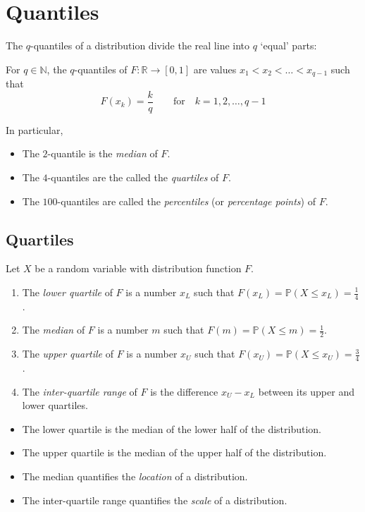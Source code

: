 \documentclass[lecture]{csm}
\newcommand{\prob}{\mathbb{P}}
\newcommand{\N}{\mathbb{N}}
\newcommand{\R}{\mathbb{R}}
\def\it{\item}
\def\bit{\begin{itemize}}
\def\eit{\end{itemize}}
\def\ben{\begin{enumerate}}
\def\een{\end{enumerate}}
\begin{document}
\section{Quantiles}
The $q$-quantiles of a distribution divide the real line into $q$ `equal' parts:

\begin{definition}
For $q\in\N$, the $q$-quantiles of $F:\R\to[0,1]$ are values $x_1 < x_2 < \ldots < x_{q-1}$ such that 
\[
F(x_k) = \frac{k}{q} \qquad\text{for}\quad k=1,2,\ldots,q-1
\]
\end{definition}

In particular,
\bit
\it The $2$-quantile is the \emph{median} of $F$.
\it The $4$-quantiles are the called the \emph{quartiles} of $F$.
\it The $100$-quantiles are called the \emph{percentiles} (or \emph{percentage points}) of $F$.
\eit

\newpage
\subsection{Quartiles}
\begin{definition}
Let $X$ be a random variable with distribution function $F$.
\ben
\it 
The \emph{lower quartile} of $F$ is a number $x_L$ such that $\displaystyle F(x_L) = \prob(X \leq x_L) = \frac{1}{4}$.
\it
The \emph{median} of $F$ is a number $m$ such that $\displaystyle F(m) = \prob(X \leq m) = \frac{1}{2}$.
\it
The \emph{upper quartile} of $F$ is a number $x_U$ such that $\displaystyle F(x_U) = \prob(X \leq x_U) = \frac{3}{4}$.
\it 
The \emph{inter-quartile range} of $F$ is the difference $x_U-x_L$ between its upper and lower quartiles.
\een
\end{definition}

\begin{remark}
\bit
\it The lower quartile is the median of the lower half of the distribution.
\it The upper quartile is the median of the upper half of the distribution.
\eit
\bit
\it The median quantifies the \emph{location} of a distribution.
\it The inter-quartile range quantifies the \emph{scale} of a distribution.
\eit
\end{remark}

\newpage
\end{document}
